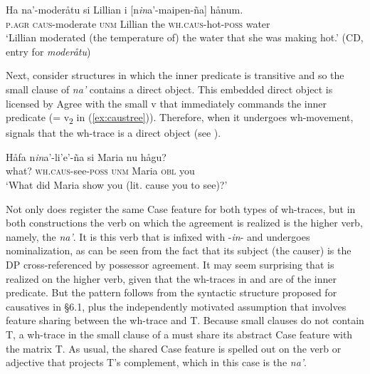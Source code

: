 \documentclass[output=paper,
modfonts
]{LSP/langsci}
\begin{document}
\begin{exe}
\begin{xlist}
\ex \label{ex:chung:32b} \gll Ha na'-moderåtu si Lillian i {[}n\emph{in}a'-maipen-ña{]} hånum.\\
\textsc{p.agr} \textsc{caus-}moderate \textsc{unm} Lillian the \textsc{wh.caus-}hot-\textsc{poss} water\\
\glt `Lillian moderated (the temperature of) the water that she was making
hot.' (CD, entry for \emph{moderåtu})
\z
\z

Next, consider structures in which the inner predicate is transitive and
so the small clause  of \emph{na'} contains a direct object.
This embedded direct object is licensed by Agree with the small v that
immediately commands the inner predicate (= v\textsubscript{2} in (\ref{ex:caustree})).
Therefore, when it undergoes wh-movement,  signals that the
wh-trace is a direct object (see \citealt[197]{gibson1980}).

\ea \label{ex:chung:33}
\gll Håfa n\emph{in}a'-li'e'-ña si Maria nu hågu?\\
what? \textsc{wh.caus-}see-\textsc{poss} \textsc{unm} Maria \textsc{obl} you\\
\glt `What did Maria show you (lit. cause you to see)?'
\z

Not only does  register the same Case feature for both types
of wh-traces, but in both constructions the verb on which the agreement
is realized is the higher verb, namely, the  \emph{na'}. It is
this verb that is infixed with -\emph{in}- and undergoes nominalization,
as can be seen from the fact that its subject (the causer) is the DP
cross-referenced by possessor agreement. It may seem surprising that
 is realized on the higher verb, given that the wh-traces in
 and  are  of the inner predicate. But the pattern
follows from the syntactic structure proposed for causatives in \S6.1, plus the independently motivated assumption that 
involves feature sharing between the wh-trace and T. Because small
clauses do not contain T, a wh-trace in the small clause  of a
 must share its abstract Case feature with the matrix T. As
usual, the shared Case feature is spelled out on the verb or adjective
that projects T's complement, which in this case is the 
\emph{na'}.


\end{xlist}
\end{exe}
\end{document}
